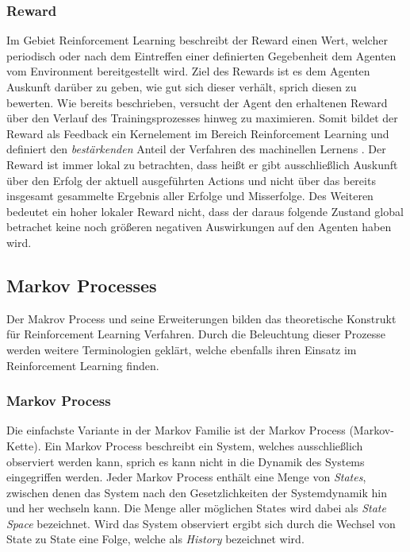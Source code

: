 \documentclass[11pt]{scrartcl}
\begin{document}
\subsubsection{Reward}
Im Gebiet Reinforcement Learning beschreibt der Reward einen Wert, welcher periodisch oder nach
dem Eintreffen einer definierten Gegebenheit dem Agenten vom Environment bereitgestellt wird.
Ziel des Rewards ist es dem Agenten Auskunft darüber zu geben, wie gut sich dieser verhält, sprich
diesen zu bewerten. Wie bereits beschrieben, versucht der Agent den erhaltenen Reward über den
Verlauf des Trainingsprozesses hinweg zu maximieren. Somit bildet der Reward als Feedback ein
Kernelement im Bereich Reinforcement Learning und definiert den \textit{bestärkenden} Anteil der 
Verfahren des machinellen Lernens \cite[~S.6 f.]{L2018}. Der Reward ist immer lokal zu betrachten,
dass heißt er gibt ausschließlich Auskunft über den Erfolg der aktuell ausgeführten Actions und
nicht über das bereits insgesamt gesammelte Ergebnis aller Erfolge und Misserfolge. Des Weiteren
bedeutet ein hoher lokaler Reward nicht, dass der daraus folgende Zustand global betrachet keine
noch größeren negativen Auswirkungen auf den Agenten haben wird.


\subsection{Markov Processes} %
Der Makrov Process und seine Erweiterungen bilden das theoretische Konstrukt für Reinforcement Learning
Verfahren. Durch die Beleuchtung dieser Prozesse werden weitere Terminologien geklärt, welche ebenfalls
ihren Einsatz im Reinforcement Learning finden.


\subsubsection{Markov Process}
Die einfachste Variante in der Markov Familie ist der Markov Process (Markov-Kette). Ein Markov Process
beschreibt ein System, welches ausschließlich observiert werden kann, sprich es kann nicht in die Dynamik
des Systems eingegriffen werden. Jeder Markov Process enthält eine Menge von \textit{States}, zwischen
denen das System nach den Gesetzlichkeiten der Systemdynamik hin und her wechseln kann. Die Menge aller
möglichen States wird dabei als \textit{State Space} bezeichnet. Wird das System observiert ergibt sich
durch die Wechsel von State zu State eine Folge, welche als \textit{History} bezeichnet wird. 
\end{document}
